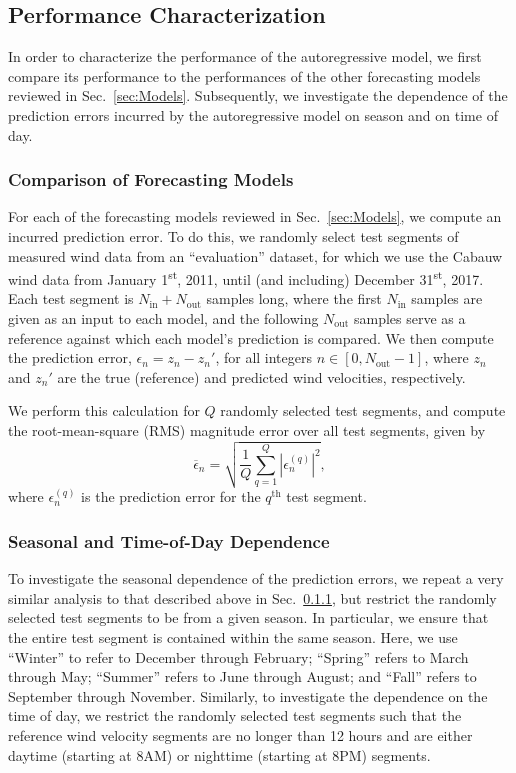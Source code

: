 \documentclass[11pt, oneside]{article}
\newcommand{\secref}[1]{Sec.~\ref{#1}}
\begin{document}
\subsection{Performance Characterization}
In order to characterize the performance of the autoregressive model, we first compare its performance to the performances of the other forecasting models reviewed in \secref{sec:Models}.
Subsequently, we investigate the dependence of the prediction errors incurred by the autoregressive model on season and on time of day.

\subsubsection{Comparison of Forecasting Models}\label{sec:Methodology:Comparison}
For each of the forecasting models reviewed in \secref{sec:Models}, we compute an incurred prediction error.
To do this, we randomly select test segments of measured wind data from an ``evaluation'' dataset, for which we use the Cabauw wind data from January 1\textsuperscript{st}, 2011, until (and including) December 31\textsuperscript{st}, 2017.
Each test segment is $N_\text{in} + N_\text{out}$ samples long, where the first $N_\text{in}$ samples are given as an input to each model, and the following $N_\text{out}$ samples serve as a reference against which each model's prediction is compared.
We then compute the prediction error, $\epsilon_n = z_n - z_n'$, for all integers $n \in [0,N_\text{out}-1]$, where $z_n$ and $z_n'$ are the true (reference) and predicted wind velocities, respectively.

We perform this calculation for $Q$ randomly selected test segments, and compute the root-mean-square (RMS) magnitude error over all test segments, given by
\begin{equation}\label{eq:RMSE}
\overline{\epsilon}_n = \sqrt{ \frac{1}{Q} \sum_{q = 1}^Q \left| \epsilon_n^{(q)} \right|^2 },
\end{equation}
where $\epsilon_n^{(q)}$ is the prediction error for the $q^\text{th}$ test segment.

\subsubsection{Seasonal and Time-of-Day Dependence}\label{sec:Methodology:SeasonalAndDiurnalDependence}
To investigate the seasonal dependence of the prediction errors, we repeat a very similar analysis to that described above in \secref{sec:Methodology:Comparison}, but restrict the randomly selected test segments to be from a given season.
In particular, we ensure that the entire test segment is contained within the same season.
Here, we use ``Winter'' to refer to December through February;
``Spring'' refers to March through May;
``Summer'' refers to June through August; and
``Fall'' refers to September through November.
Similarly, to investigate the dependence on the time of day, we restrict the randomly selected test segments such that the reference wind velocity segments are no longer than 12 hours and are either daytime (starting at 8AM) or nighttime (starting at 8PM) segments.
\end{document}
